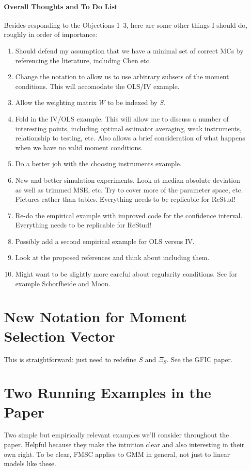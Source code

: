 \documentclass[12pt]{article}
\theoremstyle{definition}
\begin{document}
\paragraph{Overall Thoughts and To Do List}
Besides responding to the Objections 1--3, here are some other things I should do, roughly in order of importance:
  \begin{enumerate}
    \item Should defend my assumption that we have a minimal set of correct MCs by referencing the literature, including Chen etc.
    \item Change the notation to allow us to use arbitrary subsets of the moment conditions. This will accomodate the OLS/IV example.
    \item Allow the weighting matrix $W$ to be indexed by $S$.
    \item Fold in the IV/OLS example. This will allow me to discuss a number of interesting points, including optimal estimator averaging, weak instruments, relationship to testing, etc. Also allows a brief consideration of what happens when we have no valid moment conditions.
    \item Do a better job with the choosing instruments example.
    \item New and better simulation experiments. Look at median absolute deviation as well as trimmed MSE, etc. Try to cover more of the parameter space, etc. Pictures rather than tables. Everything needs to be replicable for ReStud!
    \item Re-do the empirical example with improved code for the confidence interval. Everything needs to be replicable for ReStud!
    \item Possibly add a second empirical example for OLS versus IV.
    \item Look at the proposed references and think about including them.
    \item Might want to be slightly more careful about regularity conditions. See for example Schorfheide and Moon.
  \end{enumerate}

\section{New Notation for Moment Selection Vector}
This is straightforward: just need to redefine $S$ and $\Xi_S$. See the GFIC paper.

\section{Two Running Examples in the Paper}
Two simple but empirically relevant examples we'll consider throughout the paper. Helpful because they make the intuition clear and also interesting in their own right. To be clear, FMSC applies to GMM in general, not just to linear models like these.
\end{document}
